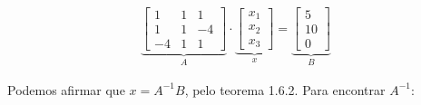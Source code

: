 \documentclass[a4paper,12pt]{article}
\begin{document}
\begin{align*}
    \underbrace{
    \begin{bmatrix}
        1 & 1 & 1\\
        1  & 1 & -4\\
        -4 & 1 & 1
    \end{bmatrix}}_{A} \cdot
    \underbrace{
    \begin{bmatrix}
        x_1\\
        x_2\\
        x_3
    \end{bmatrix}}_{x}
    =
    \underbrace{
    \begin{bmatrix}
        5\\
        10\\
        0
    \end{bmatrix}}_{B}
\end{align*}

Podemos afirmar que $x = A^{-1}B$, pelo teorema 1.6.2. Para encontrar $A^{-1}$:
\end{document}
